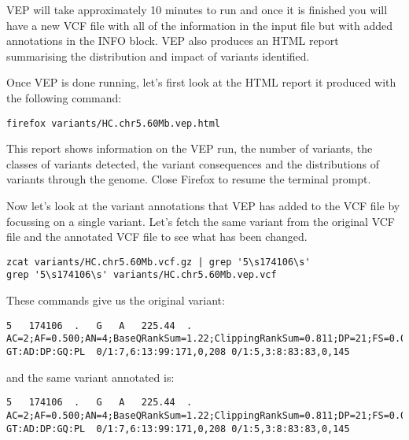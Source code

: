VEP will take approximately 10 minutes to run and once it is finished you will have a new VCF file with all of the information in the input file but with added annotations in the INFO block. VEP also produces an HTML report summarising the distribution and impact of variants identified.\\

\begin{steps}
Once VEP is done running, let's first look at the HTML report it produced with the following command:
\begin{lstlisting}
firefox variants/HC.chr5.60Mb.vep.html
\end{lstlisting}
\end{steps}

This report shows information on the VEP run, the number of variants, the classes of variants detected, the variant consequences and the distributions of variants through the genome. Close Firefox to resume the terminal prompt.\\

\begin{steps}
Now let's look at the variant annotations that VEP has added to the VCF file by focussing on a single variant. Let's fetch the same variant from the original VCF file and the annotated VCF file to see what has been changed.
\begin{lstlisting}
zcat variants/HC.chr5.60Mb.vcf.gz | grep '5\s174106\s'
grep '5\s174106\s' variants/HC.chr5.60Mb.vep.vcf
\end{lstlisting}
\end{steps}

These commands give us the original variant:

\begin{lstlisting}[breaklines=true,breakatwhitespace=false]
5	174106	.	G	A	225.44	.	AC=2;AF=0.500;AN=4;BaseQRankSum=1.22;ClippingRankSum=0.811;DP=21;FS=0.000;GQ_MEAN=127.00;GQ_STDDEV=62.23;MLEAC=2;MLEAF=0.500;MQ=60.00;MQ0=0;MQRankSum=0.322;NCC=0;QD=10.74;ReadPosRankSum=0.377;SOR=0.446	GT:AD:DP:GQ:PL	0/1:7,6:13:99:171,0,208	0/1:5,3:8:83:83,0,145
\end{lstlisting}

and the same variant annotated is:

\begin{lstlisting}[breaklines=true,breakatwhitespace=false]
5	174106	.	G	A	225.44	.	AC=2;AF=0.500;AN=4;BaseQRankSum=1.22;ClippingRankSum=0.811;DP=21;FS=0.000;GQ_MEAN=127.00;GQ_STDDEV=62.23;MLEAC=2;MLEAF=0.500;MQ=60.00;MQ0=0;MQRankSum=0.322;NCC=0;QD=10.74;ReadPosRankSum=0.377;SOR=0.446;CSQ=missense_variant|cGg/cAg|R/Q|ENSG00000153404|PLEKHG4B|ENST00000283426|16/18|||1076|protein_coding,non_coding_transcript_exon_variant&non_coding_transcript_variant|||ENSG00000153404|PLEKHG4B|ENST00000504041|5/8||||retained_intron	GT:AD:DP:GQ:PL	0/1:7,6:13:99:171,0,208	0/1:5,3:8:83:83,0,145
\end{lstlisting}

